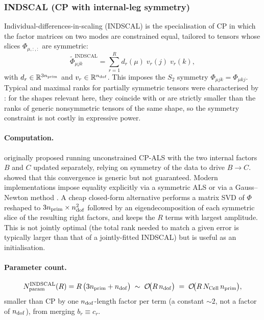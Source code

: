 \subsubsection{INDSCAL (CP with internal-leg symmetry)}
\label{sub:fc3_indscal}
Individual-differences-in-scaling (INDSCAL) \cite{carroll_analysis_1970, kolda_tensor_2009} is the
specialisation of CP in which the factor matrices on two modes are constrained equal, tailored
to tensors whose slices $\Phi_{\mu,:,:}$ are symmetric:
\begin{equation}\label{eq:fc3_indscal_ansatz}
    \tilde\Phi_{\mu j k}^{\mathrm{INDSCAL}}
    = \sum_{r=1}^{R} d_r(\mu)\; v_r(j)\; v_r(k),
\end{equation}
with $d_r\in\mathbb{R}^{3n_{\mathrm{prim}}}$ and $v_r\in\mathbb{R}^{n_{\mathrm{dof}}}$. This imposes the $S_2$
symmetry $\Phi_{\mu j k}=\Phi_{\mu k j}$. Typical and maximal ranks for
partially symmetric tensors were characterised by
\citet{ten_berge_typical_2004}: for the shapes relevant here, they coincide with or
are strictly smaller than the ranks of generic nonsymmetric tensors of the same shape, so the
symmetry constraint is not costly in expressive power.

\paragraph{Computation.} \citet{carroll_analysis_1970} originally proposed running unconstrained
CP-ALS with the two internal factors $B$ and $C$ updated separately, relying on symmetry of the
data to drive $B\to C$. \citet{ten_berge_typical_2004, ten_berge_carroll_2009} showed that this convergence is generic
but not guaranteed. Modern implementations impose equality explicitly via a symmetric ALS or via
a Gauss--Newton method \cite{kolda_tensor_2009, kolda_numerical_2015}.
A cheap closed-form alternative performs a matrix SVD of $\Phi$ reshaped to
$3n_{\mathrm{prim}}\times n_{\mathrm{dof}}^{2}$ followed by an eigendecomposition of each symmetric slice of the
resulting right factors, and keeps the $R$ terms with largest amplitude. This is not jointly
optimal (the total rank needed to match a given error is typically larger than that of a
jointly-fitted INDSCAL) but is useful as an initialisation.

\paragraph{Parameter count.}
\begin{equation}\label{eq:fc3_indscal_params}
  N_{\mathrm{param}}^{\mathrm{INDSCAL}}(R)
  = R\,\bigl(3n_{\mathrm{prim}} + n_{\mathrm{dof}}\bigr)
  \;\sim\; \mathcal{O}\!\bigl(R\,n_{\mathrm{dof}}\bigr)
  \;=\; \mathcal{O}\!\bigl(R\,N_{\mathrm{Cell}}\,n_{\mathrm{prim}}\bigr),
\end{equation}
smaller than CP by one $n_{\mathrm{dof}}$-length factor per term (a constant $\sim2$, not a
factor of $n_{\mathrm{dof}}$), from merging $b_r\equiv c_r$.

